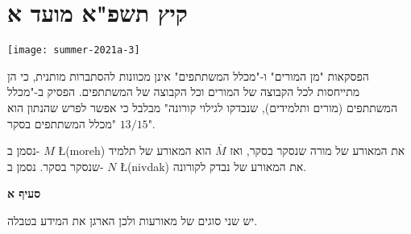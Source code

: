 
\newpage

\section{קיץ תשפ"א מועד א}

\begin{center}
\texttt{[image: summer-2021a-3]}
\end{center}

הפסקאות "מן המורים" ו-"מכלל המשתתפים" אינן מכוונות להסתברות מותנית, כי הן מתייחסות לכל הקבוצה של המורים וכל הקבוצה של המשתתפים. הפסיק ב-"מכלל המשתתפים (מורים ותלמידים), שנבדקו לגילוי קורונה" מבלבל כי אפשר לפרש שהנתון הוא
$13/15$
"מכלל המשתתפים בסקר".

נסמן ב-%
$M$ \L{(moreh)}
את המאורע של מורה שנסקר בסקר, ואז
$\overline{M}$
הוא המאורע של תלמיד שנסקר בסקר. נסמן ב-%
$N$ \L{(nivdak)}
את המאורע של נבדק לקורונה.

\textbf{סעיף א}

יש שני סוגים של מאורעות ולכן הארגן את המידע בטבלה. 

